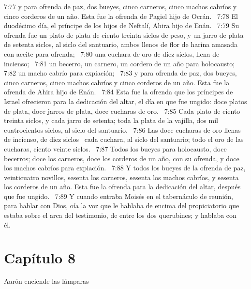 7:77 y para ofrenda de paz, dos bueyes, cinco carneros, cinco machos cabríos y cinco corderos de un año. Esta fue la ofrenda de Pagiel hijo de Ocrán.  
7:78 El duodécimo día, el príncipe de los hijos de Neftalí, Ahira hijo de Enán.  
7:79 Su ofrenda fue un plato de plata de ciento treinta siclos de peso, y un jarro de plata de setenta siclos, al siclo del santuario, ambos llenos de flor de harina amasada con aceite para ofrenda;  
7:80 una cuchara de oro de diez siclos, llena de incienso;  
7:81 un becerro, un carnero, un cordero de un año para holocausto;  
7:82 un macho cabrío para expiación;  
7:83 y para ofrenda de paz, dos bueyes, cinco carneros, cinco machos cabríos y cinco corderos de un año. Esta fue la ofrenda de Ahira hijo de Enán.  
7:84 Esta fue la ofrenda que los príncipes de Israel ofrecieron para la dedicación del altar, el día en que fue ungido: doce platos de plata, doce jarros de plata, doce cucharas de oro.  
7:85 Cada plato de ciento treinta siclos, y cada jarro de setenta; toda la plata de la vajilla, dos mil cuatrocientos siclos, al siclo del santuario.  
7:86 Las doce cucharas de oro llenas de incienso, de diez siclos  cada cuchara, al siclo del santuario; todo el oro de las cucharas, ciento veinte siclos.  
7:87 Todos los bueyes para holocausto, doce becerros; doce los carneros, doce los corderos de un año, con su ofrenda, y doce los machos cabríos para expiación.  
7:88 Y todos los bueyes de la ofrenda de paz, veinticuatro novillos, sesenta los carneros, sesenta los machos cabríos, y sesenta los corderos de un año. Esta fue la ofrenda para la dedicación del altar, después que fue ungido.  
7:89 Y cuando entraba Moisés en el tabernáculo de reunión, para hablar con Dios, oía la voz que le hablaba de encima del propiciatorio que estaba sobre el arca del testimonio, de entre los dos querubines; y hablaba con él.  
\section*{Capítulo 8}
Aarón enciende las lámparas  

